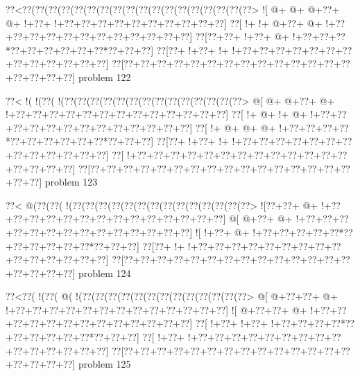 \vbox{\vbox{\goo
\0??<\0??(\0??(\0??(\0??(\0??(\0??(\0??(\0??(\0??(\0??(\0??(\0??(\0??(\0??(\0??(\0??(\0??(\0??>
\- ![\- @+\- @+\- @+\0??+\- @+\- !+\0??+\- !+\0??+\0??+\0??+\0??+\0??+\0??+\0??+\0??+\0??+\0??]
\0??[\- !+\- !+\- @+\0??+\- @+\- !+\0??+\0??+\0??+\0??+\0??+\0??+\0??+\0??+\0??+\0??+\0??+\0??]
\0??[\0??+\0??+\- !+\0??+\- @+\- !+\0??+\0??+\0??*\0??+\0??+\0??+\0??+\0??+\0??*\0??+\0??+\0??]
\0??[\0??+\- !+\0??+\- !+\- !+\0??+\0??+\0??+\0??+\0??+\0??+\0??+\0??+\0??+\0??+\0??+\0??+\0??]
\0??[\0??+\0??+\0??+\0??+\0??+\0??+\0??+\0??+\0??+\0??+\0??+\0??+\0??+\0??+\0??+\0??+\0??+\0??]
}
\hfil problem 122\hfil\break
}



\vbox{\vbox{\goo
\0??<\- !(\- !(\0??(\- !(\0??(\0??(\0??(\0??(\0??(\0??(\0??(\0??(\0??(\0??(\0??(\0??(\0??(\0??>
\- @[\- @+\- @+\0??+\- @+\- !+\0??+\0??+\0??+\0??+\0??+\0??+\0??+\0??+\0??+\0??+\0??+\0??+\0??]
\0??[\- !+\- @+\- !+\- @+\- !+\0??+\0??+\0??+\0??+\0??+\0??+\0??+\0??+\0??+\0??+\0??+\0??+\0??]
\0??[\- !+\- @+\- @+\- @+\- !+\0??+\0??+\0??+\0??*\0??+\0??+\0??+\0??+\0??+\0??*\0??+\0??+\0??]
\0??[\0??+\- !+\0??+\- !+\- !+\0??+\0??+\0??+\0??+\0??+\0??+\0??+\0??+\0??+\0??+\0??+\0??+\0??]
\0??[\- !+\0??+\0??+\0??+\0??+\0??+\0??+\0??+\0??+\0??+\0??+\0??+\0??+\0??+\0??+\0??+\0??+\0??]
\0??[\0??+\0??+\0??+\0??+\0??+\0??+\0??+\0??+\0??+\0??+\0??+\0??+\0??+\0??+\0??+\0??+\0??+\0??]
}
\hfil problem 123\hfil\break
}



\vbox{\vbox{\goo
\0??<\- @(\0??(\0??(\- !(\0??(\0??(\0??(\0??(\0??(\0??(\0??(\0??(\0??(\0??(\0??(\0??(\0??(\0??>
\- ![\0??+\0??+\- @+\- !+\0??+\0??+\0??+\0??+\0??+\0??+\0??+\0??+\0??+\0??+\0??+\0??+\0??+\0??]
\- @[\- @+\0??+\- @+\- !+\0??+\0??+\0??+\0??+\0??+\0??+\0??+\0??+\0??+\0??+\0??+\0??+\0??+\0??]
\- ![\- !+\0??+\- @+\- !+\0??+\0??+\0??+\0??+\0??*\0??+\0??+\0??+\0??+\0??+\0??*\0??+\0??+\0??]
\0??[\0??+\- !+\- !+\0??+\0??+\0??+\0??+\0??+\0??+\0??+\0??+\0??+\0??+\0??+\0??+\0??+\0??+\0??]
\0??[\0??+\0??+\0??+\0??+\0??+\0??+\0??+\0??+\0??+\0??+\0??+\0??+\0??+\0??+\0??+\0??+\0??+\0??]
}
\hfil problem 124\hfil\break
}



\vbox{\vbox{\goo
\0??<\0??(\- !(\0??(\- @(\- !(\0??(\0??(\0??(\0??(\0??(\0??(\0??(\0??(\0??(\0??(\0??(\0??(\0??>
\- @[\- @+\0??+\0??+\- @+\- !+\0??+\0??+\0??+\0??+\0??+\0??+\0??+\0??+\0??+\0??+\0??+\0??+\0??]
\- ![\- @+\0??+\0??+\- @+\- !+\0??+\0??+\0??+\0??+\0??+\0??+\0??+\0??+\0??+\0??+\0??+\0??+\0??]
\0??[\- !+\0??+\- !+\0??+\- !+\0??+\0??+\0??+\0??*\0??+\0??+\0??+\0??+\0??+\0??*\0??+\0??+\0??]
\0??[\- !+\0??+\- !+\0??+\0??+\0??+\0??+\0??+\0??+\0??+\0??+\0??+\0??+\0??+\0??+\0??+\0??+\0??]
\0??[\0??+\0??+\0??+\0??+\0??+\0??+\0??+\0??+\0??+\0??+\0??+\0??+\0??+\0??+\0??+\0??+\0??+\0??]
}
\hfil problem 125\hfil\break
}



